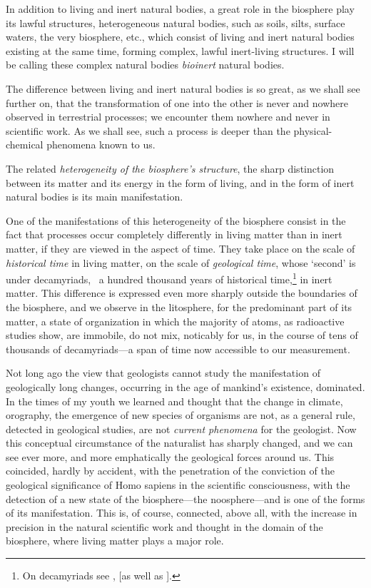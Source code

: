 In addition to living and inert natural bodies, a great role in the biosphere
play its lawful structures, heterogeneous natural bodies, such as soils, silts,
surface waters, the very biosphere, etc., which consist of living and inert
natural bodies existing at the same time, forming complex, lawful inert-living
structures.  I will be calling these complex
natural bodies \emph{bioinert} natural bodies.

The difference between living and inert natural bodies is so great, as we shall
see further on, that the transformation of one into the other is never and
nowhere observed in terrestrial processes; we encounter them nowhere and never
in scientific work.  As we shall see, such a process is deeper than the
physical-chemical phenomena known to us.

The related \emph{heterogeneity of the biosphere's structure}, the sharp
distinction between its matter and its energy in the form of living, and in the
form of inert natural bodies is its main manifestation.


\Section %
One of the manifestations of this heterogeneity of the biosphere consist in the
fact that processes occur completely differently in living matter than in inert
matter, if they are viewed in the aspect of time.  They take place on the scale
of \emph{historical time} in living
matter, on the scale of \emph{geological
time}, whose `second' is under
decamyriads, \ie\ a hundred thousand years of historical time,\footnote{
	On decamyriads see \cite{vernadsky1935nekotoryh}, [as well as
	\cite{vernadsky1954sochineniya-nekotorye}].
} in inert matter.  This difference is expressed even more sharply outside the
boundaries of the biosphere, and we observe in the litosphere, for the
predominant part of its matter, a state of organization in which the majority
of atoms, as radioactive studies show, are immobile, do not mix, noticably for
us, in the course of tens of thousands of decamyriads---a span of time now
accessible to our measurement.

Not long ago the view that geologists cannot study the manifestation of
geologically long changes, occurring in the age of mankind's existence,
dominated.  In the times of my youth we learned and thought that the change in
climate, orography, the emergence of new species of organisms are not, as a
general rule, detected in geological studies, are not \emph{current
phenomena} for the geologist.  Now this
conceptual circumstance of the naturalist has sharply changed, and we can see
ever more, and more emphatically the geological forces around us.  This
coincided, hardly by accident, with the penetration of the conviction of the
geological significance of Homo sapiens in the scientific consciousness, with
the detection of a new state of the biosphere---the noosphere---and is one of
the forms of its manifestation.  This is, of course, connected, above all, with
the increase in precision in the natural scientific work and thought in the
domain of the biosphere, where living matter plays a major role.

